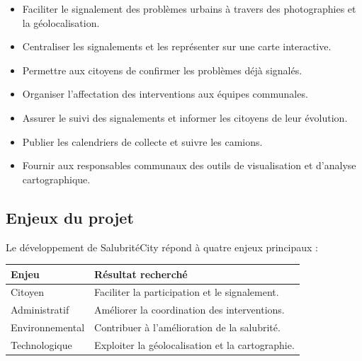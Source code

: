\documentclass[11pt,a4paper,oneside]{report}
\begin{document}
	\begin{itemize}
		\item Faciliter le signalement des problèmes urbains
		à travers des photographies et la géolocalisation.
		
		\item Centraliser les signalements et les représenter
		sur une carte interactive.
		
		\item Permettre aux citoyens de confirmer les
		problèmes déjà signalés.
		
		\item Organiser l'affectation des interventions
		aux équipes communales.
		
		\item Assurer le suivi des signalements et informer
		les citoyens de leur évolution.
		
		\item Publier les calendriers de collecte et suivre
		les camions.
		
		\item Fournir aux responsables communaux des
		outils de visualisation et d'analyse cartographique.
	\end{itemize}
	
	\subsection{Enjeux du projet}
	
	Le développement de SalubritéCity répond à quatre
	enjeux principaux :
	
	\begin{table}[h!]
		\centering
		\small
		\renewcommand{\arraystretch}{1.2}
		\begin{tabular}{|p{3cm}|p{11cm}|}
			\hline
			\textbf{Enjeu} & \textbf{Résultat recherché} \\ \hline
			Citoyen & Faciliter la participation et le signalement. \\ \hline
			Administratif & Améliorer la coordination des interventions. \\ \hline
			Environnemental & Contribuer à l'amélioration de la salubrité. \\ \hline
			Technologique & Exploiter la géolocalisation et la cartographie. \\ \hline
		\end{tabular}
	\end{table}
	
	
	
\end{document}
